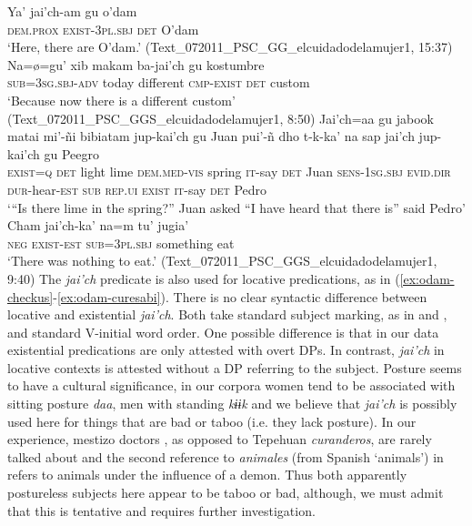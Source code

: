 \documentclass[output=paper]{langsci/langscibook}
\begin{document}
\ea
\label{ex:odam-tepehuans}
\gll Ya’ jai’ch-am gu o’dam\\
\textsc{dem.prox} \textsc{exist-3pl.sbj} \textsc{det} O'dam\\
\glt ‘Here, there are O'dam.’ (Text\_072011\_PSC\_GG\_elcuidadodelamujer1, 15:37)
\z
\ea
\label{ex:odam-custom}
\gll Na=\o=gu’ 	xib 	makam 	ba-jai’ch 	gu 	kostumbre\\
\textsc{sub=3sg.sbj-adv} today	different	\textsc{cmp-exist}	\textsc{det} 	custom\\
\glt ‘Because now there is a different custom’ (Text\_072011\_PSC\_GGS\_elcuidadodelamujer1, 8:50)
\z 
\ea
\label{ex:odam-lime}
\gll Jai’ch=aa	gu	jabook	matai	mi’-ñi		bibiatam jup-kai’ch	gu	Juan pui’-ñ			dho		t\stacktwo{/}{e}-k-ka’		na	sap		jai’ch jup-kai’ch	gu	Peegro\\
\textsc{exist=q}	\textsc{det}	light	lime	\textsc{dem.med-vis}	spring \textsc{it}-say		\textsc{det}	Juan \textsc{sens-1sg.sbj}	\textsc{evid.dir}	\textsc{dur}-hear-\textsc{est}	\textsc{sub}	\textsc{rep.ui}	\textsc{exist} \textsc{it}-say		\textsc{det}	Pedro\\
\glt ‘“Is there lime in the spring?” Juan asked “I have heard that there is” said Pedro’ \citep[76]{willettw2015}
\z 
\ea
\label{ex:odam-eat}
\gll Cham 	jai’ch-ka’ 	na=m 			tu’ 		jugia’\\
\textsc{neg}	\textsc{exist-est} 	\textsc{sub=3pl.sbj} 	something 	eat\\
\glt ‘There was nothing to eat.’ (Text\_072011\_PSC\_GGS\_elcuidadodelamujer1, 9:40)
\z 
 The \emph{jai'ch} predicate is also used for locative predications, as in (\ref{ex:odam-checkus}-\ref{ex:odam-curesabi}). There is no clear syntactic difference between locative and existential \emph{jai'ch}. Both take standard subject marking, as in  and , and standard V-initial word order. One possible difference is that in our data existential predications are only attested with overt DPs. In contrast, \emph{jai'ch} in locative contexts is attested without a DP referring to the subject. Posture seems to have a cultural significance, in our corpora women tend to be associated with sitting posture \emph{daa}, men with standing \emph{kɨɨk} and we believe that \emph{jai'ch} is possibly used here for things that are bad or taboo (i.e. they lack posture). In our experience, mestizo doctors , as opposed to Tepehuan \emph{curanderos}, are rarely talked about and the second reference to \emph{animales} (from Spanish `animals') in  refers to animals under the influence of a demon. Thus both apparently postureless subjects here appear to be taboo or bad, although, we must admit that this is tentative and requires further investigation.
\end{document}

